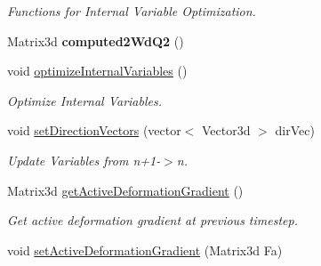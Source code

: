 \begin{DoxyCompactItemize}
\begin{DoxyCompactList}\small\item\em Functions for Internal Variable Optimization. \item\end{DoxyCompactList}\item 
\hypertarget{classvoom_1_1_plastic_material_a6d7d1909051ac206dbb8ab1b8386fd0c}{
Matrix3d {\bfseries computed2WdQ2} ()}
\label{classvoom_1_1_plastic_material_a6d7d1909051ac206dbb8ab1b8386fd0c}

\item 
\hypertarget{classvoom_1_1_plastic_material_a3dc595751b99c5acaa7f1426c5a16b00}{
void \hyperlink{classvoom_1_1_plastic_material_a3dc595751b99c5acaa7f1426c5a16b00}{optimizeInternalVariables} ()}
\label{classvoom_1_1_plastic_material_a3dc595751b99c5acaa7f1426c5a16b00}

\begin{DoxyCompactList}\small\item\em Optimize Internal Variables. \item\end{DoxyCompactList}\item 
void \hyperlink{classvoom_1_1_plastic_material_adeed31ed97955b441efa8beeb56ce7e1}{setDirectionVectors} (vector$<$ Vector3d $>$ dirVec)
\begin{DoxyCompactList}\small\item\em Update Variables from n+1-\/$>$n. \item\end{DoxyCompactList}\item 
\hypertarget{classvoom_1_1_plastic_material_af56f4b905533dcb96d4b736f1c666c75}{
Matrix3d \hyperlink{classvoom_1_1_plastic_material_af56f4b905533dcb96d4b736f1c666c75}{getActiveDeformationGradient} ()}
\label{classvoom_1_1_plastic_material_af56f4b905533dcb96d4b736f1c666c75}

\begin{DoxyCompactList}\small\item\em Get active deformation gradient at previous timestep. \item\end{DoxyCompactList}\item 
\hypertarget{classvoom_1_1_plastic_material_a6eac10e3913ba07e893a05cbe263eb50}{
void \hyperlink{classvoom_1_1_plastic_material_a6eac10e3913ba07e893a05cbe263eb50}{setActiveDeformationGradient} (Matrix3d Fa)}
\label{classvoom_1_1_plastic_material_a6eac10e3913ba07e893a05cbe263eb50}


\end{DoxyCompactItemize}
